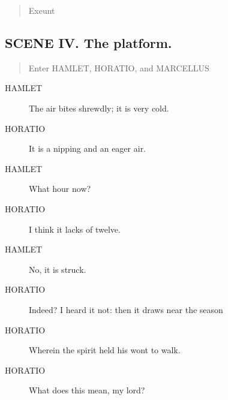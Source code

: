 \documentclass{article}
\begin{document}
\begin{quote}
Exeunt
\end{quote}
          
\subsection{SCENE IV.  The platform.}
          
\begin{quote}
Enter HAMLET, HORATIO, and MARCELLUS
\end{quote}
          
\begin{description}
            
\item[HAMLET] The air bites shrewdly; it is very cold.
\end{description}
          
\begin{description}
            
\item[HORATIO] It is a nipping and an eager air.
\end{description}
          
\begin{description}
            
\item[HAMLET] What hour now?
\end{description}
          
\begin{description}
            
\item[HORATIO] I think it lacks of twelve.
\end{description}
          
\begin{description}
            
\item[HAMLET] No, it is struck.
\end{description}
          
\begin{description}
            
\item[HORATIO] Indeed? I heard it not: then it draws near the season
\item[HORATIO] Wherein the spirit held his wont to walk.
\item[HORATIO] What does this mean, my lord?
\end{description}
          
\end{document}
